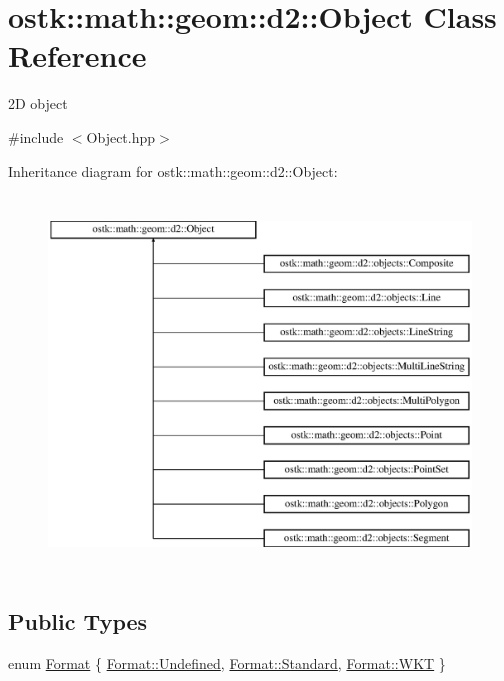 \hypertarget{classostk_1_1math_1_1geom_1_1d2_1_1_object}{}\section{ostk\+:\+:math\+:\+:geom\+:\+:d2\+:\+:Object Class Reference}
\label{classostk_1_1math_1_1geom_1_1d2_1_1_object}


2D object  




{\ttfamily \#include $<$Object.\+hpp$>$}

Inheritance diagram for ostk\+:\+:math\+:\+:geom\+:\+:d2\+:\+:Object\+:\begin{figure}[H]
\begin{center}
\leavevmode
\includegraphics[height=10.000000cm]{classostk_1_1math_1_1geom_1_1d2_1_1_object}
\end{center}
\end{figure}
\subsection*{Public Types}
\begin{DoxyCompactItemize}
\item 
enum \hyperlink{classostk_1_1math_1_1geom_1_1d2_1_1_object_aa76f9e30caebf4005bafbdff447f66cf}{Format} \{ \hyperlink{classostk_1_1math_1_1geom_1_1d2_1_1_object_aa76f9e30caebf4005bafbdff447f66cfaec0fc0100c4fc1ce4eea230c3dc10360}{Format\+::\+Undefined}, 
\hyperlink{classostk_1_1math_1_1geom_1_1d2_1_1_object_aa76f9e30caebf4005bafbdff447f66cfaeb6d8ae6f20283755b339c0dc273988b}{Format\+::\+Standard}, 
\hyperlink{classostk_1_1math_1_1geom_1_1d2_1_1_object_aa76f9e30caebf4005bafbdff447f66cfa9ab05752e6beff2c783a6046ed592661}{Format\+::\+W\+KT}
 \}
\end{DoxyCompactItemize}
